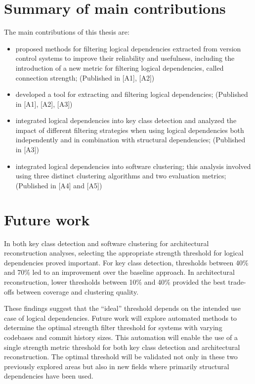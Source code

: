 \section{Summary of main contributions}

\hspace{4em}The main contributions of this thesis are:  

\begin{itemize}  
    \item proposed methods for filtering logical dependencies extracted from version control systems to improve their reliability and usefulness, including the introduction of a new metric for filtering logical dependencies, called connection strength;   \hfill (Published in [A1], [A2])
    \item developed a tool for extracting and filtering logical dependencies;  \hfill (Published in [A1], [A2], [A3])
    \item integrated logical dependencies into key class detection and analyzed the impact of different filtering strategies when using logical dependencies both independently and in combination with structural dependencies;  \hfill (Published in [A3])
    \item integrated logical dependencies into software clustering; this analysis involved using three distinct clustering algorithms and two evaluation metrics;   \hfill (Published in [A4] and [A5])
\end{itemize}  

\section{Future work}

\hspace{4em}In both key class detection and software clustering for architectural reconstruction analyses, selecting the appropriate strength threshold for logical dependencies proved important. For key class detection, thresholds between 40\% and 70\% led to an improvement over the baseline approach. In architectural reconstruction, lower thresholds between 10\% and 40\% provided the best trade-offs between coverage and clustering quality. 

These findings suggest that the “ideal” threshold depends on the intended use case of logical dependencies. Future work will explore automated methods to determine the optimal strength filter threshold for systems with varying codebases and commit history sizes. This automation will enable the use of a single strength metric threshold for both key class detection and architectural reconstruction. The optimal threshold will be validated not only in these two previously explored areas but also in new fields where primarily structural dependencies have been used.
